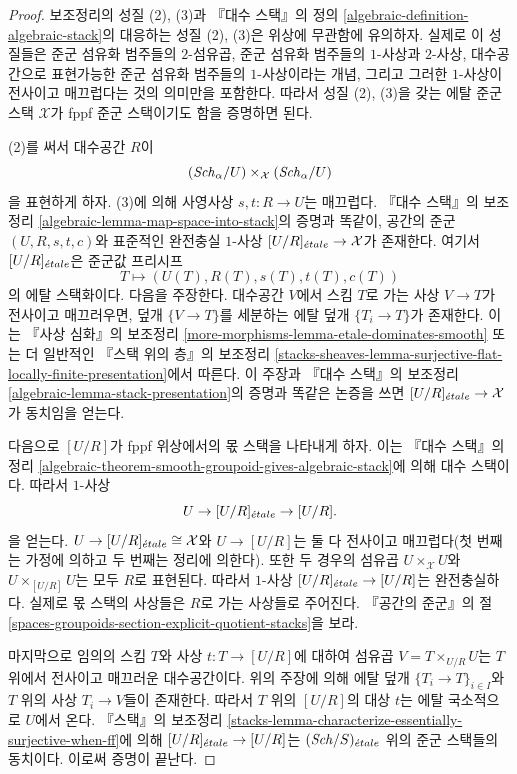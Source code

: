 \begin{proof}
보조정리의 성질 (2), (3)과 『대수 스택』의 정의
\ref{algebraic-definition-algebraic-stack}의 대응하는 성질 (2), (3)은
위상에 무관함에 유의하자. 실제로 이 성질들은 준군 섬유화 범주들의
$2$-섬유곱, 준군 섬유화 범주들의 $1$-사상과 $2$-사상, 대수공간으로
표현가능한 준군 섬유화 범주들의 $1$-사상이라는 개념, 그리고 그러한
$1$-사상이 전사이고 매끄럽다는 것의 의미만을 포함한다. 따라서 성질
(2), (3)을 갖는 에탈 준군 스택 $\mathcal{X}$가 fppf 준군 스택이기도
함을 증명하면 된다.

\medskip\noindent
(2)를 써서 대수공간 $R$이
$$
(\mathit{Sch}_\alpha/U) \times_\mathcal{X} (\mathit{Sch}_\alpha/U)
$$
을 표현하게 하자. (3)에 의해 사영사상 $s, t : R \to U$는 매끄럽다.
『대수 스택』의 보조정리
\ref{algebraic-lemma-map-space-into-stack}의 증명과 똑같이, 공간의 준군
$(U, R, s, t, c)$와 표준적인 완전충실 $1$-사상
$[U/R]_{\acute{e}tale} \to \mathcal{X}$가 존재한다. 여기서 $[U/R]_{\acute{e}tale}$은
준군값 프리시프
$$
T \longmapsto (U(T), R(T), s(T), t(T), c(T))
$$
의 에탈 스택화이다. 다음을 주장한다. 대수공간 $V$에서 스킴 $T$로 가는
사상 $V \to T$가 전사이고 매끄러우면, 덮개 $\{V \to T\}$를 세분하는
에탈 덮개 $\{T_i \to T\}$가 존재한다. 이는 『사상 심화』의 보조정리
\ref{more-morphisms-lemma-etale-dominates-smooth} 또는 더 일반적인
『스택 위의 층』의 보조정리
\ref{stacks-sheaves-lemma-surjective-flat-locally-finite-presentation}에서
따른다. 이 주장과 『대수 스택』의 보조정리
\ref{algebraic-lemma-stack-presentation}의 증명과 똑같은 논증을 쓰면
$[U/R]_{\acute{e}tale} \to \mathcal{X}$가 동치임을 얻는다.

\medskip\noindent
다음으로 $[U/R]$가 fppf 위상에서의 몫 스택을 나타내게 하자.
이는 『대수 스택』의 정리
\ref{algebraic-theorem-smooth-groupoid-gives-algebraic-stack}에 의해
대수 스택이다. 따라서 $1$-사상
$$
U \to [U/R]_{\acute{e}tale} \to [U/R].
$$
을 얻는다. $U \to [U/R]_{\acute{e}tale} \cong \mathcal{X}$와
$U \to [U/R]$는 둘 다 전사이고 매끄럽다(첫 번째는 가정에 의하고
두 번째는 정리에 의한다). 또한 두 경우의 섬유곱
$U \times_\mathcal{X} U$와 $U \times_{[U/R]} U$는 모두 $R$로 표현된다.
따라서 $1$-사상 $[U/R]_{\acute{e}tale} \to [U/R]$는 완전충실하다. 실제로 몫
스택의 사상들은 $R$로 가는 사상들로 주어진다. 『공간의 준군』의 절
\ref{spaces-groupoids-section-explicit-quotient-stacks}을 보라.

\medskip\noindent
마지막으로 임의의 스킴 $T$와 사상 $t : T \to [U/R]$에 대하여 섬유곱
$V = T \times_{U/R} U$는 $T$ 위에서 전사이고 매끄러운 대수공간이다.
위의 주장에 의해 에탈 덮개 $\{T_i \to T\}_{i \in I}$와 $T$ 위의 사상
$T_i \to V$들이 존재한다. 따라서 $T$ 위의 $[U/R]$의 대상 $t$는 에탈
국소적으로 $U$에서 온다. 『스택』의 보조정리
\ref{stacks-lemma-characterize-essentially-surjective-when-ff}에 의해
$[U/R]_{\acute{e}tale} \to [U/R]$는 $(\mathit{Sch}/S)_{\acute{e}tale}$ 위의 준군 스택들의
동치이다. 이로써 증명이 끝난다.
\end{proof}
















